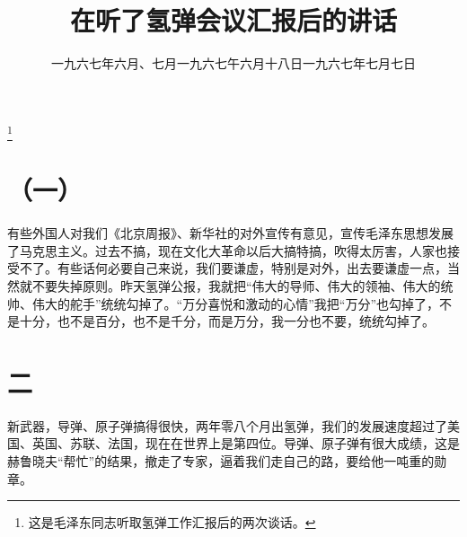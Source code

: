 
\title{在听了氢弹会议汇报后的讲话}
\date{一九六七年六月、七月}
\thanks{这是毛泽东同志听取氢弹工作汇报后的两次谈话。}
\maketitle


\date{一九六七午六月十八日}
\section*{（一）}

有些外国人对我们《北京周报》、新华社的对外宣传有意见，宣传毛泽东思想发展了马克思主义。过去不搞，现在文化大革命以后大搞特搞，吹得太厉害，人家也接受不了。有些话何必要自己来说，我们要谦虚，特别是对外，出去要谦虚一点，当然就不要失掉原则。昨天氢弹公报，我就把“伟大的导师、伟大的领袖、伟大的统帅、伟大的舵手”统统勾掉了。“万分喜悦和激动的心情”我把“万分”也勾掉了，不是十分，也不是百分，也不是千分，而是万分，我一分也不要，统统勾掉了。

\date{一九六七年七月七日}
\section*{二}

新武器，导弹、原子弹搞得很快，两年零八个月出氢弹，我们的发展速度超过了美国、英国、苏联、法国，现在在世界上是第四位。导弹、原子弹有很大成绩，这是赫鲁晓夫“帮忙”的结果，撤走了专家，逼着我们走自己的路，要给他一吨重的勋章。

